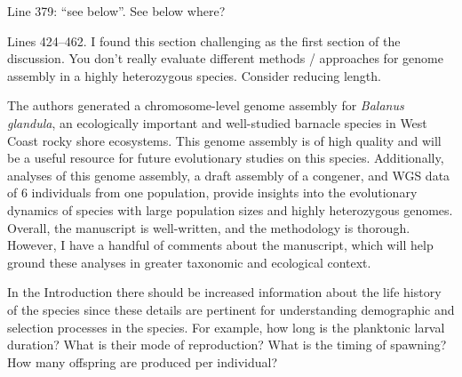 
\begin{point}{} %
Line 379: ``see below''. See below where?
\end{point}


\begin{point}{} %
Lines 424--462. I found this section challenging as the first section of
the discussion. You don't really evaluate different methods / approaches
for genome assembly in a highly heterozygous species. Consider reducing
length.
\end{point}


\pagebreak


\begin{itquote}
The authors generated a chromosome-level genome assembly for
\emph{Balanus glandula}, an ecologically important and well-studied
barnacle species in West Coast rocky shore ecosystems. This genome
assembly is of high quality and will be a useful resource for future
evolutionary studies on this species. Additionally, analyses of this
genome assembly, a draft assembly of a congener, and WGS data of 6
individuals from one population, provide insights into the evolutionary
dynamics of species with large population sizes and highly heterozygous
genomes. Overall, the manuscript is well-written, and the methodology is
thorough. However, I have a handful of comments about the manuscript,
which will help ground these analyses in greater taxonomic and
ecological context.
\end{itquote}


\begin{point}{} %
In the Introduction there should be increased information about the life
history of the species since these details are pertinent for
understanding demographic and selection processes in the species. For
example, how long is the planktonic larval duration? What is their mode
of reproduction? What is the timing of spawning? How many offspring are
produced per individual?
\end{point}

